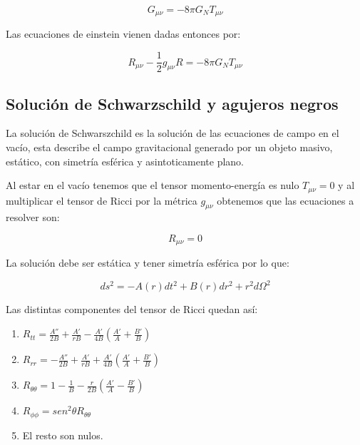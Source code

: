 \documentclass{article}
\begin{document}
\begin{equation}
    G_{\mu \nu}=-8\pi  G_{N}T_{\mu \nu}
\end{equation}

Las ecuaciones de einstein vienen dadas entonces por:

\begin{equation}
    R_{\mu \nu}-\frac{1}{2}g_{\mu \nu}R=-8\pi  G_{N}T_{\mu \nu}
\end{equation}

\subsection{Solución de Schwarzschild y agujeros negros}

La solución de Schwarszchild es la solución de las ecuaciones de campo en el vacío, esta describe el campo gravitacional generado por un objeto masivo, estático, con simetría esférica y asintoticamente plano.\cite{rodriguez2019solucion}

Al estar en el vacío tenemos que el tensor momento-energía es nulo $T_{\mu \nu}=0$ y al multiplicar el tensor de Ricci por la métrica $g_{\mu \nu}$ obtenemos que las ecuaciones a resolver son:

 \begin{equation} \label{vacio}
     R_{\mu \nu}=0
 \end{equation}
 
La solución debe ser estática y tener simetría esférica por lo que:

\begin{equation}
    ds^{2}=
    -A(r)dt^{2} 
    +B(r)dr^{2} 
    +r^{2}d\Omega^{2}
\end{equation}

Las distintas componentes del tensor de Ricci quedan así:

\begin{enumerate}
    \item $R_{tt}=\frac{A''}{2B}+\frac{A'}{rB}-\frac{A'}{4B}\left(\frac{A'}{A}+\frac{B'}{B}\right)$
    \item $R_{rr}=-\frac{A''}{2B}+\frac{A'}{rB}+\frac{A'}{4B}\left(\frac{A'}{A}+\frac{B'}{B}\right)$
    \item $R_{\theta\theta}=1-\frac{1}{B}-\frac{r}{2B}\left(\frac{A'}{A}-\frac{B'}{B}\right)$
    \item $R_{\phi\phi}=sen^{2}\theta R_{\theta\theta}$
    \item El resto son nulos.
\end{enumerate}
\end{document}
